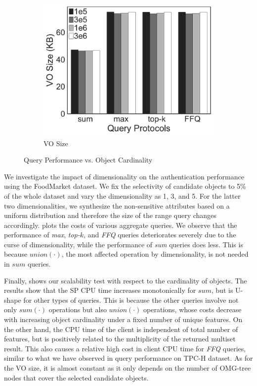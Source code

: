 \begin{figure}[t]
\begin{subfigure}[b]{.33\linewidth}
    \includegraphics[width=\linewidth]{exp-figs/aggregate-queries/cardinality_vo.pdf}
    \caption{VO Size}
  \end{subfigure}
  \caption{Query Performance vs. Object Cardinality}\label{fig:aggregate-queries:diversity}
\end{figure}

We investigate the impact of dimensionality on the authentication performance using the FoodMarket dataset. We fix the selectivity of candidate objects to 5\% of the whole dataset and vary the dimensionality as 1, 3, and 5. For the latter two dimensionalities, we synthesize the non-sensitive attributes based on a uniform distribution and therefore the size of the range query changes accordingly.  plots the costs of various aggregate queries. We observe that the performance of \emph{max}, \emph{top-$k$}, and \emph{FFQ} queries deteriorates severely due to the curse of dimensionality, while the performance of \emph{sum} queries does less. This is because $union(\cdot)$, the most affected operation by dimensionality, is not needed in $sum$ queries.

Finally,  shows our scalability test with respect to the cardinality of objects.
The results show that the SP CPU time increases monotonically for $sum$, but is U-shape for other types of queries. This is because the other queries involve not only $sum(\cdot)$ operations but also $union(\cdot)$ operations, whose costs decrease with increasing object cardinality under a fixed number of unique features. On the other hand, the CPU time of the client is independent of total number of features, but is positively related to the multiplicity of the returned multiset result. This also causes a relative high cost in client CPU time for \emph{FFQ} queries, similar to what we have observed in query performance on TPC-H dataset. As for the VO size, it is almost constant as it only depends on the number of OMG-tree nodes that cover the selected candidate objects.

